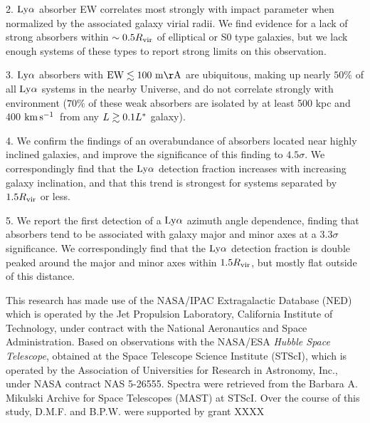 \documentclass[twocolumn,tighten]{aastex62}
\newcommand{\kms}{$\rm km\, s^{-1}$}
\begin{document}
2. $\rm Ly\alpha$ absorber EW correlates most strongly with impact parameter when normalized by the associated galaxy virial radii. We find evidence for a lack of strong absorbers within $\sim 0.5 R_{\rm vir}$ of elliptical or S0 type galaxies, but we lack enough systems of these types to report strong limits on this observation.

3. $\rm Ly\alpha$ absorbers with $\rm EW \lesssim 100~m\AA$ are ubiquitous, making up nearly $50\%$ of all $\rm Ly\alpha$ systems in the nearby Universe, and do not correlate strongly with environment ($70\%$ of these weak absorbers are isolated by at least 500 kpc and 400 \kms~from any $L \gtrsim0.1 L^{\**}$ galaxy). 

4. We confirm the \cite{french2017} findings of an overabundance of absorbers located near highly inclined galaxies, and improve the significance of this finding to $4.5\sigma$. We correspondingly find that the $\rm Ly\alpha$ detection fraction increases with increasing galaxy inclination, and that this trend is strongest for systems separated by $1.5 R_{\rm vir}$ or less.

5. We report the first detection of a $\rm Ly\alpha$ azimuth angle dependence, finding that absorbers tend to be associated with galaxy major and minor axes at a $3.3\sigma$ significance. We correspondingly find that the $\rm Ly\alpha$ detection fraction is double peaked around the major and minor axes within $1.5 R_{\rm vir}$, but mostly flat outside of this distance.





\acknowledgements

This research has made use of the NASA/IPAC Extragalactic Database (NED) which is operated by the Jet Propulsion Laboratory, California Institute of Technology, under contract with the National Aeronautics and Space Administration. Based on observations with the NASA/ESA \textit{Hubble Space Telescope}, obtained at the Space Telescope Science Institute (STScI), which is operated by the Association of Universities for Research in Astronomy, Inc., under NASA contract NAS 5-26555. Spectra were retrieved from the Barbara A. Mikulski Archive for Space Telescopes (MAST) at STScI. Over the course of this study, D.M.F. and B.P.W. were supported by grant XXXX
\end{document}
